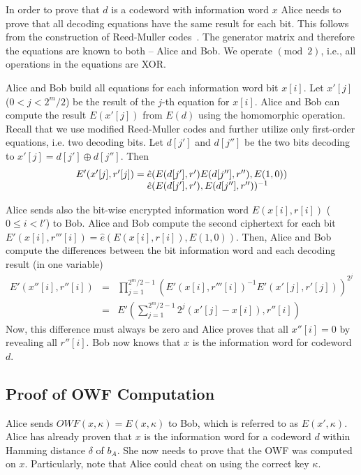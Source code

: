 \documentclass{llncs}
\begin{document}
In order to prove that $d$ is a codeword with information word $x$ Alice needs to prove that all decoding equations have the same result for each bit.
This follows from the construction of Reed-Muller codes~\cite{Mul54,Ree54}.
The generator matrix and therefore the equations are known to both -- Alice and Bob.
We operate $\left(\textrm{mod} \enspace 2 \right)$, i.e., all operations in the equations are XOR.

Alice and Bob build all equations for each information word bit $x[i]$.
Let $x'[j]$ ($0 < j < 2^{m}/2$) be the result of the $j$-th equation for $x[i]$.
Alice and Bob can compute the result $E(x'[j])$ from $E(d)$ using the homomorphic operation.
Recall that we use modified Reed-Muller codes and further utilize only first-order equations, i.e. two decoding bits.
Let $d[j']$ and $d[j'']$ be the two bits decoding to $x'[j] = d[j'] \oplus d[j'']$.
Then
$$
\setlength{\arraycolsep}{0pt}
\begin{array}{rl}
E'(x'[j], r'[j]) = \hat{e}( & E(d[j'], r') E(d[j''], r''), E(1, 0)) \\
                   \hat{e}( & E(d[j'], r'), E(d[j''], r''))^{-1}
\end{array}
\setlength{\arraycolsep}{3pt}
$$

Alice sends also the bit-wise encrypted information word $E(x[i], r[i])$ ($0 \leq i < l'$) to Bob.
Alice and Bob compute the second ciphertext for each bit $E'(x[i], r'''[i]) = \hat{e}(E(x[i], r[i]), E(1, 0))$.
Then, Alice and Bob compute the differences between the bit information word and each decoding result (in one variable)
\begin{eqnarray*}
E'(x''[i], r''[i]) & = & \prod_{j = 1}^{2^{m}/2 - 1} (E'(x[i], r'''[i])^{-1} E'(x'[j], r'[j]))^{2^j} \\
                   & = & E'(\sum_{j = 1}^{2^{m}/2 - 1} 2^j (x'[j] - x[i]), r''[i])
\end{eqnarray*}
Now, this difference must always be zero and Alice proves that all $x''[i] = 0$ by revealing all $r''[i]$.
Bob now knows that $x$ is the information word for codeword $d$.

\subsection{Proof of OWF Computation}
\label{sec:zkpmac}

Alice sends $OWF(x, \kappa) = E(x, \kappa)$ to Bob, which is referred to as $E(x', \kappa)$.
Alice has already proven that $x$ is the information word for a codeword $d$ within Hamming distance $\delta$ of $b_A$.
She now needs to prove that the OWF was computed on $x$.
Particularly, note that Alice could cheat on using the correct key $\kappa$.
\end{document}
